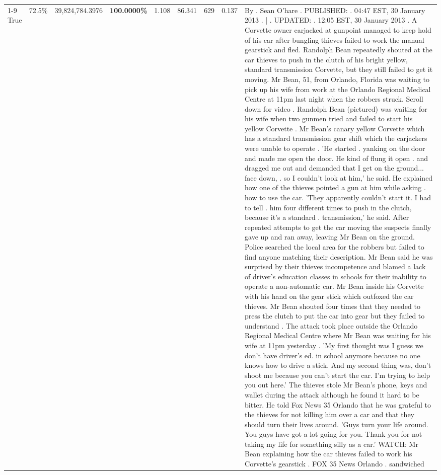 \begin{table}[H]
\begin{tabular}{lllrlllll}
\cline{1-9} \cline{2-9}
True & 72.5\% & 39,824,784.3976 & \bfseries \color{red} 100.0000\% & 1.108 & 86.341 & 629 & 0.137 & By . Sean O'hare . PUBLISHED: . 04:47 EST, 30 January 2013 . | . UPDATED: . 12:05 EST, 30 January 2013 . A Corvette owner carjacked at gunpoint managed to keep hold of his car after bungling thieves failed to work the manual gearstick and fled. Randolph Bean repeatedly shouted at the car thieves to push in the clutch of his bright yellow, standard transmission Corvette, but they still failed to get it moving. Mr Bean, 51, from Orlando, Florida was waiting to pick up his wife from work at the Orlando Regional Medical Centre at 11pm last night when the robbers struck. Scroll down for video . Randolph Bean (pictured) was waiting for his wife when two gunmen tried and failed to start his yellow Corvette . Mr Bean's canary yellow Corvette which has a standard transmission gear shift which the carjackers were unable to operate . 'He started . yanking on the door and made me open the door. He kind of flung it open . and dragged me out and demanded that I get on the ground... face down, . so I couldn't look at him,' he said. He explained how one of the thieves pointed a gun at him while asking . how to use the car. 'They apparently couldn't start it. I had to tell . him four different times to push in the clutch, because it's a standard . transmission,' he said. After repeated attempts to get the car moving the suspects finally gave up and ran away, leaving Mr Bean on the ground. Police searched the local area for the robbers but failed to find anyone matching their description. Mr Bean said he was surprised by their thieves incompetence and blamed a lack of driver's education classes in schools for their inability to operate a non-automatic car. Mr Bean inside his Corvette with his hand on the gear stick which outfoxed the car thieves. Mr Bean shouted four times that they needed to press the clutch to put the car into gear but they failed to understand . The attack took place outside the Orlando Regional Medical Centre where Mr Bean was waiting for his wife at 11pm yesterday . 'My first thought was I guess we don't have driver's ed. in school anymore because no one knows how to drive a stick. And my second thing was, don't shoot me because you can't start the car. I'm trying to help you out here.' The thieves stole Mr Bean's phone, keys and wallet during the attack although he found it hard to be bitter. He told Fox News 35 Orlando that he was grateful to the thieves for not killing him over a car and that they should turn their lives around. 'Guys turn your life around. You guys have got a lot going for you. Thank you for not taking my life for something silly as a car.' WATCH: Mr Bean explaining how the car thieves failed to work his Corvette's gearstick . FOX 35 News Orlando . sandwiched \\

\end{tabular}
\end{table}
